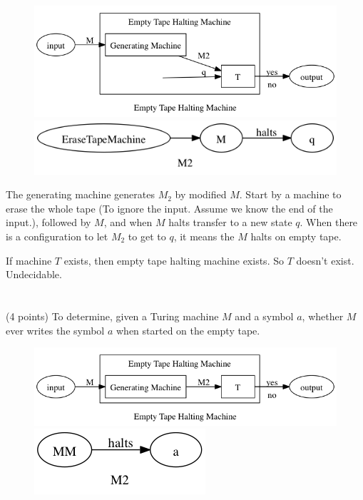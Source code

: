 \documentclass[paper=a4, fontsize=11pt]{scrartcl} %
\begin{document}
\begin{figure}[H]
  \centering
  \includegraphics[width=\textwidth]{9-3.gv.png}
  \includegraphics[width=\textwidth]{9-3.gv.2.png}
\end{figure}

The generating machine generates $M_2$ by modified $M$. Start by a
machine to erase the whole tape (To ignore the input. Assume we know
the end of the input.), followed by $M$, and when $M$ halts transfer
to a new state $q$. When there is a configuration to let $M_2$ to get
to $q$, it means the $M$ halts on empty tape.

If machine $T$ exists, then empty tape halting machine exists. So $T$
doesn't exist. Undecidable.


\section{}
\begin{fancyquotes}
  (4 points) To determine, given a Turing machine $M$ and a symbol
  $a$, whether $M$ ever writes the symbol $a$ when started on the
  empty tape.
\end{fancyquotes}

\begin{figure}[H]
  \centering
  \includegraphics[width=\textwidth]{9-4.gv.png}
  \includegraphics[width=.5\textwidth]{9-4.gv.2.png}
\end{figure}
\end{document}

